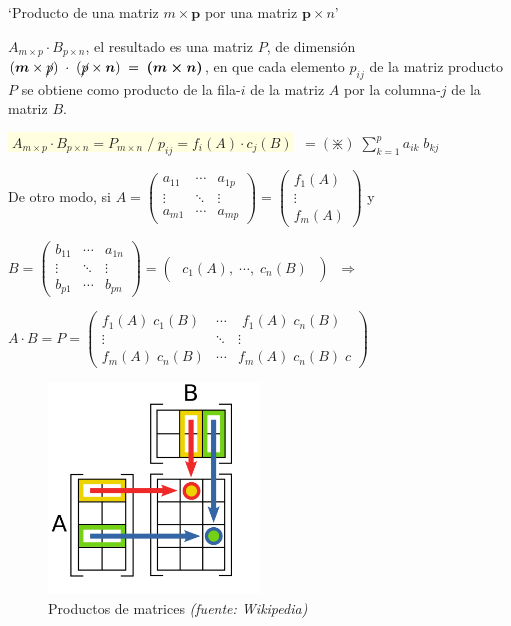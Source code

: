 \begin{defi}`Producto de una matriz $m \times \boldsymbol{p}$ por una matriz $\boldsymbol{p} \times n$'

$A_{m\times p} \cdot B_{p\times n}$, el resultado es una matriz $P$, de dimensión  $(\boldsymbol{m} \times \cancel{p})\;  \cdot \; (\cancel{p} \times \boldsymbol{n})\; =\; \boldsymbol{(m \times n)} $, en que cada elemento $p_{ij}$ de la matriz producto $P$ se obtiene como producto de la fila-$i$ de la matriz $A$ por la columna-$j$ de la matriz $B$. 

 \colorbox{LightYellow}{$\boxed{\displaystyle \; A_{m\times p} \cdot B_{p\times n}=P_{m \times n}\; / \; p_{ij}=f_i(A)\cdot c_j(B)}$} $\;= (\divideontimes)\; \sum_{k=1}^{p}{a_{ik}\; b_{kj}}\; $

De otro modo, si $A=\left( \begin{matrix} \boxed{a_{11}} &\boxed{\cdots} & \boxed{a_{1p}}\\
\vdots & \ddots & \vdots \\ a_{m1} & \cdots & a_{mp}   \end{matrix}\right)=
\left( \begin{matrix} f_1(A) \\ \vdots \\ f_m(A)  \end{matrix}\right)$ y 

$B=\left( \begin{matrix} \boxed{b_{11}} &\cdots & a_{1n}\\
\boxed{\vdots} & \ddots & \vdots \\ \boxed{b_{p1}} & \cdots & b_{pn}   \end{matrix}\right)=
\left( \begin{matrix} \;  c_1(A),\; \cdots ,\; c_n(B)\;   \end{matrix}\right) \; \; \Rightarrow$

$A\cdot B= P = \left( \begin{matrix} \boxed{f_1(A)\; c_1(B)} & \cdots &\;  f_1(A)\; c_n(B) \\
\vdots & \ddots & \vdots \\
f_m(A)\; c_n(B) & \cdots & f_m(A) \; c_n(B) \; c  \end{matrix}\right)$

	\begin{figure}[]
		\centering
		\includegraphics[width=0.5\textwidth]{imagenes/imagenes03/T03IM01.png}
		\caption{Productos de matrices \footnotesize\textit{{(fuente: Wikipedia)}}}
	\end{figure}

\end{defi}
